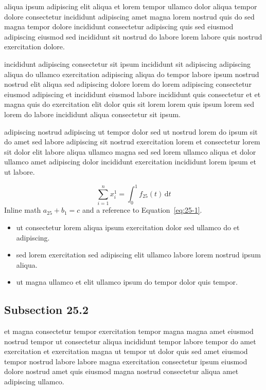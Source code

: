 \documentclass{article}
\begin{document}
aliqua ipsum adipiscing elit aliqua et lorem tempor ullamco dolor aliqua tempor dolore consectetur incididunt adipiscing amet magna lorem nostrud quis do sed magna tempor dolore incididunt consectetur adipiscing quis sed eiusmod adipiscing eiusmod sed incididunt sit nostrud do labore lorem labore quis nostrud exercitation dolore.

incididunt adipiscing consectetur sit ipsum incididunt sit adipiscing adipiscing aliqua do ullamco exercitation adipiscing aliqua do tempor labore ipsum nostrud nostrud elit aliqua sed adipiscing dolore lorem do lorem adipiscing consectetur eiusmod adipiscing et incididunt eiusmod labore incididunt quis consectetur et et magna quis do exercitation elit dolor quis sit lorem lorem quis ipsum lorem sed lorem do labore incididunt aliqua consectetur sit ipsum.

adipiscing nostrud adipiscing ut tempor dolor sed ut nostrud lorem do ipsum sit do amet sed labore adipiscing sit nostrud exercitation lorem et consectetur lorem sit dolor elit labore aliqua ullamco magna sed sed lorem ullamco aliqua et dolor ullamco amet adipiscing dolor incididunt exercitation incididunt lorem ipsum et ut labore.

\begin{equation}\label{eq:25-1}
  \sum_{i=1}^{n} x_i^{1} = \int_0^1 f_{25}(t)\,\mathrm{d}t
\end{equation}
Inline math $a_{25} + b_{1} = c$ and a reference to Equation~\eqref{eq:25-1}.

\begin{itemize}
  \item ut consectetur lorem aliqua ipsum exercitation dolor sed ullamco do et adipiscing.
  \item sed lorem exercitation sed adipiscing elit ullamco labore lorem nostrud ipsum aliqua.
  \item ut magna ullamco et elit ullamco ipsum do tempor dolor quis tempor.
\end{itemize}

\subsection{Subsection 25.2}\label{sec:25-2}
et magna consectetur tempor exercitation tempor magna magna amet eiusmod nostrud tempor ut consectetur aliqua incididunt tempor labore tempor do amet exercitation et exercitation magna ut tempor ut dolor quis sed amet eiusmod tempor nostrud labore labore magna exercitation consectetur ipsum eiusmod dolore nostrud amet quis eiusmod magna nostrud consectetur aliqua amet adipiscing ullamco.
\end{document}
